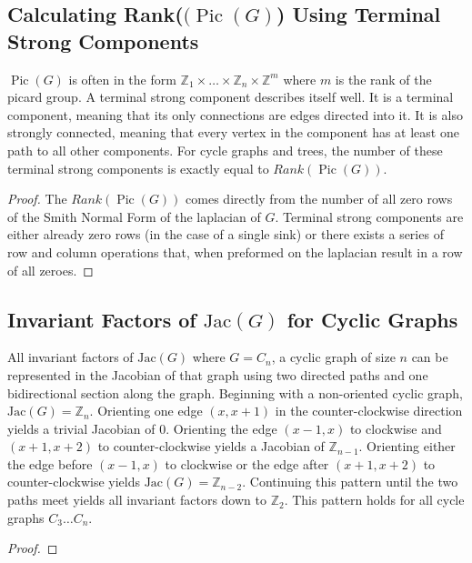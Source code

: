 \documentclass[11pt,reqno]{amsart}
\DeclareMathOperator{\Pic}{Pic}
\newcommand{\Jac}{\textrm{Jac}}{}
\theoremstyle{definition}
\theoremstyle{plain}
\begin{document}


	\subsection{Calculating Rank($(\Pic(G)$) Using Terminal Strong Components}
		$\Pic(G)$ is often in the form $\mathbb{Z}_1 \times \dots \times \mathbb{Z}_n \times \mathbb{Z}^m$ where $m$ is
		the rank of the picard group.  A terminal strong component describes itself well.  It is a terminal component,
		meaning that its only connections are edges directed into it.  It is also strongly connected, meaning that every
		vertex in the component has at least one path to all other components.  For cycle graphs and trees, the number
		of these terminal strong components is exactly equal to $Rank(\Pic(G))$.

		\begin{proof}
			The $Rank(\Pic(G))$ comes directly from the number of all zero rows of the Smith Normal Form of the laplacian of
			$G$.  Terminal strong components are either already zero rows (in the case of a single sink) or there
			exists a series of row and column operations that, when preformed on the laplacian result in a row of all
			zeroes.
		\end{proof}

	\subsection{Invariant Factors of $\Jac(G)$ for Cyclic Graphs}
		All invariant factors of $\Jac(G)$ where $G = C_n$, a cyclic graph of size $n$ can be represented in the Jacobian
		of that graph using two directed paths and one bidirectional section along the graph.  Beginning with a
		non-oriented cyclic graph, $\Jac(G) = \mathbb{Z}_n$.  Orienting one edge $(x, x+1)$ in the counter-clockwise
		direction yields a trivial Jacobian of ${0}$.  Orienting the edge $(x-1, x)$ to clockwise and $(x+1, x+2)$ to
		counter-clockwise yields a Jacobian of $\mathbb{Z}_{n-1}$.  Orienting either the edge before $(x-1, x)$ to clockwise
		or the edge after $(x+1, x+2)$ to counter-clockwise yields $\Jac(G) = \mathbb{Z}_{n-2}$.  Continuing this pattern
		until the two paths meet yields all invariant factors down to $\mathbb{Z}_2$.  This pattern holds for all cycle
		graphs $C_3 \dots C_n$.
		\begin{proof}

		\end{proof}
\end{document}
